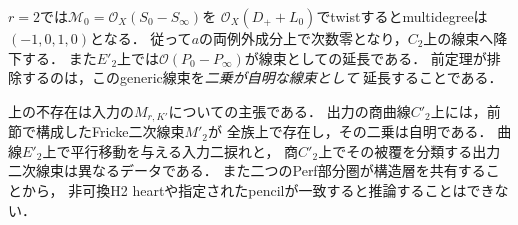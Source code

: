 \begin{remark}[線束自体の延長との区別]
$r=2$では$\mathcal M_0=\mathcal O_X(S_0-S_\infty)$を
$\mathcal O_X(D_++L_0)$でtwistするとmultidegreeは$(-1,0,1,0)$となる．
従って$a$の両例外成分上で次数零となり，$C_2$上の線束へ降下する．
また$E'_2$上では$\mathcal O(P_0-P_\infty)$が線束としての延長である．
前定理が排除するのは，このgeneric線束を\emph{二乗が自明な線束として}
延長することである．
\end{remark}

\begin{remark}[入力と出力の二次線束]
上の不存在は入力の$M_{r,K'}$についての主張である．
出力の商曲線$C'_2$上には，前節で構成したFricke二次線束$M'_2$が
全族上で存在し，その二乗は自明である．
曲線$E'_2$上で平行移動を与える入力二捩れと，
商$C'_2$上でその被覆を分類する出力二次線束は異なるデータである．
また二つのPerf部分圏が構造層を共有することから，
非可換H2 heartや指定されたpencilが一致すると推論することはできない．
\end{remark}
